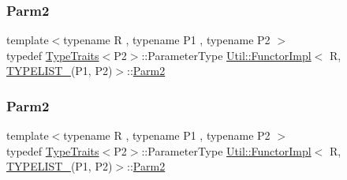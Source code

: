 \mbox{\label{classUtil_1_1FunctorImpl_3_01R_00_01TYPELIST__2_07P1_00_01P2_08_4_a9df4ce5861151ea2ca3416ee19140d5f}} 
\subsubsection{\texorpdfstring{Parm2}{Parm2}\hspace{0.1cm}{\footnotesize\ttfamily [1/3]}}
{\footnotesize\ttfamily template$<$typename R , typename P1 , typename P2 $>$ \\
typedef \mbox{\hyperlink{classUtil_1_1TypeTraits}{Type\+Traits}}$<$P2$>$\+::Parameter\+Type \mbox{\hyperlink{classUtil_1_1FunctorImpl}{Util\+::\+Functor\+Impl}}$<$ R, \mbox{\hyperlink{adat__devel__install_2include_2adat_2typelist_8h_a311cb99af993804c6737ae46c5cbfaff}{T\+Y\+P\+E\+L\+I\+S\+T\+\_}}(P1, P2)$>$\+::\mbox{\hyperlink{structUtil_1_1Private_1_1FunctorImplBase_a554085cd798ef14838a59b528f0feb2e}{Parm2}}}

\mbox{\label{classUtil_1_1FunctorImpl_3_01R_00_01TYPELIST__2_07P1_00_01P2_08_4_a9df4ce5861151ea2ca3416ee19140d5f}} 
\subsubsection{\texorpdfstring{Parm2}{Parm2}\hspace{0.1cm}{\footnotesize\ttfamily [2/3]}}
{\footnotesize\ttfamily template$<$typename R , typename P1 , typename P2 $>$ \\
typedef \mbox{\hyperlink{classUtil_1_1TypeTraits}{Type\+Traits}}$<$P2$>$\+::Parameter\+Type \mbox{\hyperlink{classUtil_1_1FunctorImpl}{Util\+::\+Functor\+Impl}}$<$ R, \mbox{\hyperlink{adat__devel__install_2include_2adat_2typelist_8h_a311cb99af993804c6737ae46c5cbfaff}{T\+Y\+P\+E\+L\+I\+S\+T\+\_}}(P1, P2)$>$\+::\mbox{\hyperlink{structUtil_1_1Private_1_1FunctorImplBase_a554085cd798ef14838a59b528f0feb2e}{Parm2}}}

